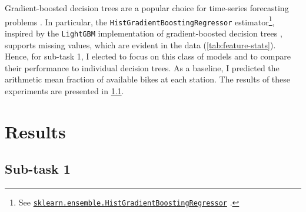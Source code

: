 \documentclass[11pt]{extarticle}
\newcommand{\sklearn}[1]{
  \href{https://scikit-learn.org/stable/modules/generated/sklearn.#1.html}{\lstinline|sklearn.#1|}
}
\begin{document}
Gradient-boosted decision trees are a popular choice for time-series forecasting
problems
\parencite{Bojer2021}.
In particular, the \texttt{HistGradientBoostingRegressor}
estimator\footnote{See \sklearn{ensemble.HistGradientBoostingRegressor}.}, inspired by
the \texttt{LightGBM} implementation of gradient-boosted decision trees
\parencite{Ke2017}, supports missing values, which are evident in the data
(\cref{tab:feature-stats}).
Hence, for sub-task 1, I elected to focus on this class of models and to compare their
performance to individual decision trees.
As a baseline, I predicted the arithmetic mean fraction of available bikes at each station.
The results of these experiments are presented in \cref{sec:results-subtask-1}.

\section{Results}
\label{sec:results}

\subsection{Sub-task 1}
\label{sec:results-subtask-1}
\end{document}
